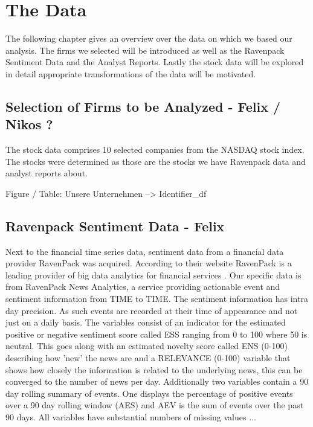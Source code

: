 \chapter{The Data}
The following chapter gives an overview over the data on which we based our analysis. The firms we selected will be introduced as well as the Ravenpack Sentiment Data and the Analyst Reports. Lastly the stock data will be explored in detail appropriate transformations of the data will be motivated. 


\section{Selection of Firms to be Analyzed - Felix / Nikos ? }
The stock data comprises 10 selected companies from the NASDAQ stock index. The stocks were determined as those are the stocks we have Ravenpack data and analyst reports about. 

Figure / Table: Unsere Unternehmen --> Identifier\_df


\section{Ravenpack Sentiment Data - Felix}
Next to the financial time series data, sentiment data from a financial data provider RavenPack was acquired. According to their website RavenPack is a leading provider of big data analytics for financial services \citep{RavenPack}. Our specific data is from RavenPack News Analytics, a service providing actionable event and sentiment information from TIME to TIME. The sentiment information has intra day precision. As such events are recorded at their time of appearance and not just on a daily basis. The variables consist of an indicator for the estimated positive or negative sentiment score called ESS ranging from 0 to 100 where 50 is neutral. This goes along with an estimated novelty score called ENS (0-100) describing how 'new' the news are and a RELEVANCE (0-100) variable that shows how closely the information is related to the underlying news, this can be converged to the number of news per day. Additionally two variables contain a 90 day rolling summary of events. One displays the percentage of positive events over a 90 day rolling window (AES) and AEV is the sum of events over the past 90 days. All variables have substantial numbers of missing values ...

